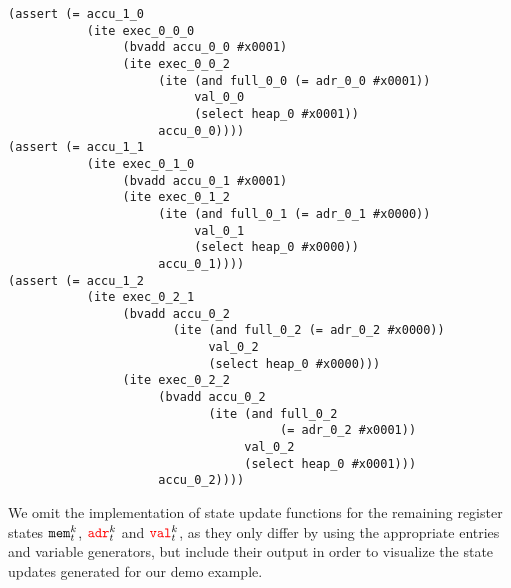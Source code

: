 \begin{lstlisting}[style=smtlib]
(assert (= accu_1_0
           (ite exec_0_0_0
                (bvadd accu_0_0 #x0001)
                (ite exec_0_0_2
                     (ite (and full_0_0 (= adr_0_0 #x0001))
                          val_0_0
                          (select heap_0 #x0001))
                     accu_0_0))))
(assert (= accu_1_1
           (ite exec_0_1_0
                (bvadd accu_0_1 #x0001)
                (ite exec_0_1_2
                     (ite (and full_0_1 (= adr_0_1 #x0000))
                          val_0_1
                          (select heap_0 #x0000))
                     accu_0_1))))
(assert (= accu_1_2
           (ite exec_0_2_1
                (bvadd accu_0_2
                       (ite (and full_0_2 (= adr_0_2 #x0000))
                            val_0_2
                            (select heap_0 #x0000)))
                (ite exec_0_2_2
                     (bvadd accu_0_2
                            (ite (and full_0_2
                                      (= adr_0_2 #x0001))
                                 val_0_2
                                 (select heap_0 #x0001)))
                     accu_0_2))))
\end{lstlisting}


\noindent
We omit the implementation of state update functions for the remaining register states $\texttt{mem}^k_t$, ${\color{red}\texttt{adr}}^k_t$ and ${\color{red}\texttt{val}}^k_t$, as they only differ by using the appropriate  entries and variable generators, but include their output in order to visualize the state updates generated for our demo example.


